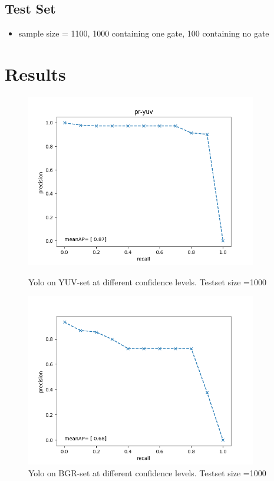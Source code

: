 \documentclass{article}
\begin{document}
\subsection{Test Set}
\begin{itemize}
	\item sample size = 1100, 1000 containing one gate, 100 containing no gate
\end{itemize}

\section{Results}
\begin{figure}[!htb]
	\centering
	\begin{minipage}{.5\textwidth}
		\centering
		\includegraphics[width=0.9\textwidth]{yolo-gate-yuv-1000}
		\caption{Yolo on YUV-set at different confidence levels. Testset size =1000}
	\end{minipage}%
	\begin{minipage}{0.5\textwidth}
		\centering
		\includegraphics[width=0.9\textwidth]{yolo-gate-1000}
		\caption{Yolo on BGR-set at different confidence levels. Testset size =1000}
	\end{minipage}
\end{figure}
\end{document}
